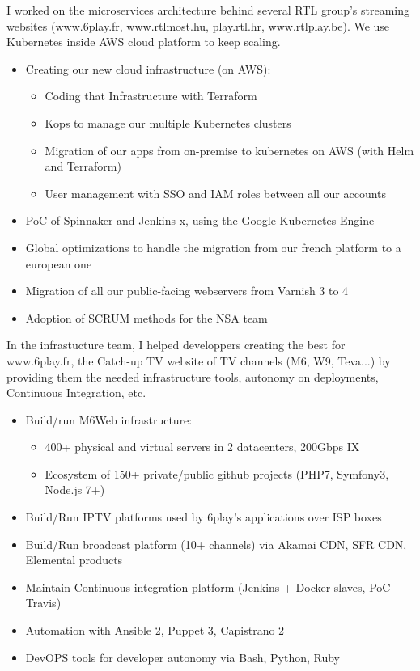 \documentclass[12pt,a4paper,roman]{moderncv}          %
\begin{document}
{I worked on the microservices architecture behind several RTL group's streaming websites (www.6play.fr, www.rtlmost.hu, play.rtl.hr, www.rtlplay.be). We use Kubernetes inside AWS cloud platform to keep scaling.
\begin{itemize}
  \item Creating our new cloud infrastructure (on AWS):
  \begin{itemize}
    \item Coding that Infrastructure with Terraform
    \item Kops to manage our multiple Kubernetes clusters
    \item Migration of our apps from on-premise to kubernetes on AWS (with Helm and Terraform)
    \item User management with SSO and IAM roles between all our accounts
  \end{itemize}
  \item PoC of Spinnaker and Jenkins-x, using the Google Kubernetes Engine
  \item Global optimizations to handle the migration from our french platform to a european one
  \item Migration of all our public-facing webservers from Varnish 3 to 4
  \item Adoption of SCRUM methods for the NSA team
\end{itemize}}

{In the infrastucture team, I helped developpers creating the best for www.6play.fr, the Catch-up TV website of TV channels (M6, W9, Teva...) by providing them the needed infrastructure tools, autonomy on deployments, Continuous Integration, etc.
\begin{itemize}
  \item Build/run M6Web infrastructure:
  \begin{itemize}
    \item 400+ physical and virtual servers in 2 datacenters, 200Gbps IX
    \item Ecosystem of 150+ private/public github projects (PHP7, Symfony3, Node.js 7+)
  \end{itemize}
  \item Build/Run IPTV platforms used by 6play's applications over ISP boxes
  \item Build/Run broadcast platform (10+ channels) via Akamai CDN, SFR CDN, Elemental products
  \item Maintain Continuous integration platform (Jenkins + Docker slaves, PoC Travis)
  \item Automation with Ansible 2, Puppet 3, Capistrano 2
  \item DevOPS tools for developer autonomy via Bash, Python, Ruby
\end{itemize}}
\end{document}
